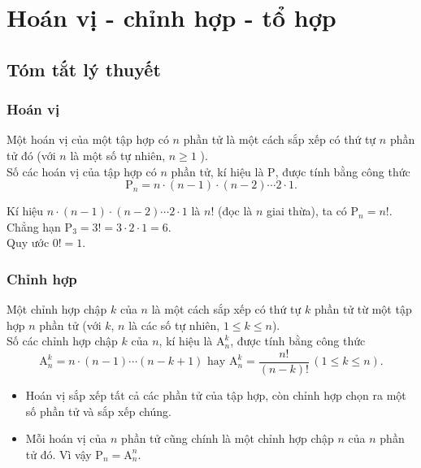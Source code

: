 \def\tenchude{HOÁN VỊ - CHỈNH HỢP - TỔ HỢP}
\newpage \setcounter{dang}{0}
\section{Hoán vị - chỉnh hợp - tổ hợp}
\subsection{Tóm tắt lý thuyết}
\subsubsection{Hoán vị}
\begin{dn}{}
	Một hoán vị của một tập hợp có $n$ phần tử là một cách sắp xếp có thứ tự $n$ phần tử đó (với $n$ là một số tự nhiên, $n \geq 1$ ).\\
	Số các hoán vị của tập hợp có $n$ phần tử, kí hiệu là $\mathrm{P}$, được tính bằng công thức $$\mathrm{P}_{n}=n \cdot(n-1) \cdot(n-2) \cdots 2 \cdot 1.$$
\end{dn}

\begin{note}
	Kí hiệu $n \cdot(n-1) \cdot(n-2) \cdots 2 \cdot 1$ là $n!$ (đọc là $n$ giai thừa), ta có $\mathrm{P}_{n}=n!$. Chẳng hạn $\mathrm{P}_{3}=3!=3 \cdot 2 \cdot 1=6$.\\
	Quy ước $0 !=1$.
\end{note}

\subsubsection{Chỉnh hợp}
\begin{dn}{}
	Một chỉnh hợp chập $k$ của $n$ là một cách sắp xếp có thứ tự $k$ phần tử từ một tập hợp $n$ phần tử (với $k$, $n$ là các số tự nhiên, $1 \leq k \leq n$).\\
	Số các chỉnh hợp chập $k$ của $n$, kí hiệu là $\mathrm{A}_{n}^{k}$, được tính bằng công thức
	$$\mathrm{A}_{n}^{k}=n \cdot(n-1) \cdots(n-k+1) \text { hay } \mathrm{A}_{n}^{k}=\dfrac{n!}{(n-k)!}\,(1 \leq k \leq n).$$
\end{dn}

\begin{note}
	\begin{itemize}
		\item Hoán vị sắp xếp tất cả các phần tử của tập hợp, còn chỉnh hợp chọn ra một số phần tử và sắp xếp chúng.
		\item Mỗi hoán vị của $n$ phần tử cũng chính là một chỉnh hợp chập $n$ của $n$ phần tử đó. Vì vậy $\mathrm{P}_{n}=\mathrm{A}_{n}^{n}$.
	\end{itemize}
\end{note}


